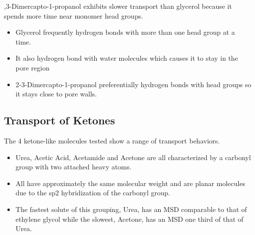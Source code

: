 \documentclass{article}
\begin{document}
  ,3-Dimercapto-1-propanol exhibits slower transport than glycerol because it spends more time
  near monomer head groups. %
  \begin{itemize}
    \item Glycerol frequently hydrogen bonds with more than one head group at a time.
    \item It also hydrogen bond with water molecules which causes it to stay in the pore region
    \item 2-3-Dimercapto-1-propanol preferentially hydrogen bonds with head groups so it stays
    close to pore walls.
  \end{itemize} 

  \subsection*{Transport of Ketones}
  
  
  The 4 ketone-like molecules tested show a range of transport behaviors.
  \begin{itemize}
    \item Urea, Acetic Acid, Acetamide and Acetone are all characterized by a carbonyl group
    with two attached heavy atoms. 
    \item All have approximately the same molecular weight and are planar molecules due to
    the sp2 hybridization of the carbonyl group.
    \item The fastest solute of this grouping, Urea, has an MSD comparable to that of ethylene
    glycol while the slowest, Acetone, has an MSD one third of that of Urea.
  \end{itemize}
  
\end{document}
